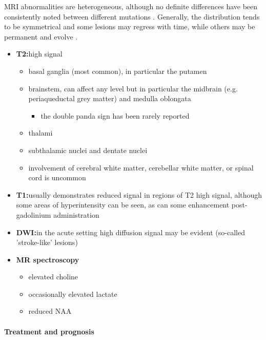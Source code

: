 MRI abnormalities are heterogeneous, although no definite differences have been consistently noted between different mutations . Generally, the distribution tends to be symmetrical and some lesions may regress with time, while others may be permanent and evolve .

\begin{itemize}
	\item
	\textbf{T2:}high signal 
	
	\begin{itemize}
		\item
		basal ganglia (most common), in particular the putamen
		\item
		brainstem, can affect any level but in particular the midbrain (e.g. periaqueductal grey matter) and medulla oblongata
		
		\begin{itemize}
			\item
			the double panda sign has been rarely reported 
		\end{itemize}
		\item
		thalami
		\item
		subthalamic nuclei and dentate nuclei 
		\item
		involvement of cerebral white matter, cerebellar white matter, or spinal cord is uncommon\hspace{0pt} 
	\end{itemize}
	\item
	\textbf{T1:}usually demonstrates reduced signal in regions of T2 high signal, although some areas of hyperintensity can be seen, as can some enhancement post-gadolinium administration
	\item
	\textbf{DWI:}in the acute setting high diffusion signal may be evident (so-called 'stroke-like' lesions)
	\item
	\textbf{MR spectroscopy}
	
	\begin{itemize}
		\item
		elevated choline
		\item
		occasionally elevated lactate
		\item
		reduced NAA
	\end{itemize}
\end{itemize}

\paragraph{Treatment and prognosis}

